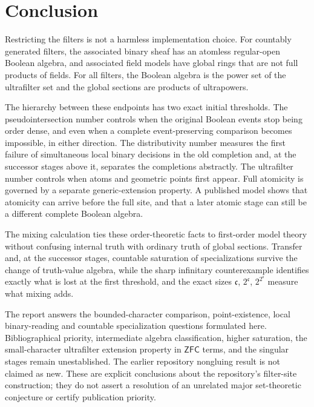 \documentclass[11pt,letterpaper]{article}
\theoremstyle{definition}
\theoremstyle{remark}
\newcommand{\cc}{\mathfrak c}
\newcommand{\ZFC}{\mathsf{ZFC}}
\begin{document}
\section{Conclusion}

Restricting the filters is not a harmless implementation choice.
For countably generated filters, the associated binary sheaf has
an atomless regular-open Boolean algebra, and associated field
models have global rings that are not full products of fields.
For all filters, the Boolean algebra is the power set of the
ultrafilter set and the global sections are products of ultrapowers.

The hierarchy between these endpoints has two exact initial
thresholds. The pseudointersection number controls when the
original Boolean events stop being order dense, and even when a
complete event-preserving comparison becomes impossible, in either
direction. The distributivity number measures the first failure of
simultaneous local binary decisions in the old completion and, at the
successor stages above it, separates the completions abstractly. The
ultrafilter number controls when atoms and geometric points first
appear. Full atomicity is governed by a separate generic-extension
property. A published model shows that atomicity can arrive before
the full site, and that a later atomic stage can still be a
different complete Boolean algebra.

The mixing calculation ties these order-theoretic facts to
first-order model theory without confusing internal truth with
ordinary truth of global sections. Transfer and, at the successor
stages, countable saturation of specializations survive the change of
truth-value algebra, while the sharp infinitary counterexample
identifies exactly what is lost at the first threshold, and the exact
sizes $\cc$, $2^\cc$, $2^{2^\cc}$ measure what mixing adds.

The report answers the bounded-character comparison, point-existence,
local binary-reading and countable specialization questions formulated
here. Bibliographical priority, intermediate algebra classification,
higher saturation, the small-character ultrafilter extension property in
$\ZFC$ terms, and the singular stages remain unestablished. The earlier
repository nongluing result is not claimed as new. These are explicit
conclusions about the repository's filter-site construction; they do not
assert a resolution of an unrelated major set-theoretic conjecture or
certify publication priority.
\end{document}
